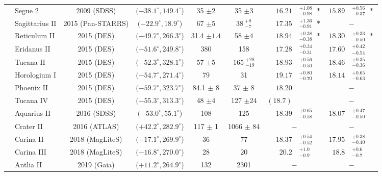 \begin{table}[p]
\begin{center}
{\begin{tabular}{cl|c|c|c|c||rl|rl}
& Segue 2 		& 2009 {\scriptsize (SDSS)} & $(-38.1^\circ, 149.4^\circ$) 		& 35 $\pm$2 	& 35 $\pm$3			& $16.21$&$^{+1.08}_{-0.98} \ \ \ast$	& $15.89$&$^{+0.56}_{-0.37} \ \ \ast$ \\
& Sagittarius II 		& 2015 {\scriptsize (Pan-STARRS)} & $(-22.9^\circ, 18.9^\circ$) & 67 $\pm$5 	& $38 \ ^{+8}_{-7}$		& $17.35$&$^{+1.36}_{-0.91} \ \ \ast$ 	& \multicolumn{2}{c}{$-$} \\ 
& Reticulum II 		& 2015 {\scriptsize (DES)} & $(-49.7^\circ, 266.3^\circ$) 		& 31.4 $\pm1.4$ 	& 58 $\pm4$		& $18.94$&$^{+0.38}_{-0.38} \ \ \ast$	& $18.30$&$^{+0.33}_{-0.50} \ \ \ast$  \\ 
& Eridanus II 		& 2015 {\scriptsize (DES)} & $(-51.6^\circ, 249.8^\circ$) 		&  380 			&  158			& $17.28$&$^{+0.34}_{-0.31}$ 		& $17.60$&$^{+0.42}_{-0.54}$ \\ 
& Tucana II 		& 2015 {\scriptsize (DES)} & $(-52.3^\circ, 328.1^\circ$) 		& 57 $\pm5$ 		& $165 \ ^{+28}_{-19}$	& $18.93$&$^{+0.56}_{-0.50}$ 	& $18.46$&$^{+0.35}_{-0.36}$  \\
& Horologium I 		& 2015 {\scriptsize (DES)} & $(-54.7^\circ, 271.4^\circ$) 		&  79				&  31				& $19.17$&$^{+0.80}_{-0.70}$ 		& $18.14$&$^{+0.65}_{-0.63}$ \\
& Phoenix II 		& 2015 {\scriptsize (DES)} & $(-59.7^\circ, 323.7^\circ$) 		& 84.1 $\pm$ 8 	& 37 $\pm$ 8		& $18.20$ &			 		& \multicolumn{2}{c}{$-$} \\ 
& Tucana IV 		& 2015 {\scriptsize (DES)} & $(-55.3^\circ, 313.3^\circ$) 		& 48 $\pm4$ 		& 127 $\pm24$		& $(18.7)$  &					& \multicolumn{2}{c}{$-$} \\
& Aquarius II 		& 2016 {\scriptsize (SDSS)} & $(-53.0^\circ, 55.1^\circ$) 		&  108		 	&  125			& $18.39$&$^{+0.65}_{-0.58}$ 		& $18.07$&$^{+0.47}_{-0.50}$ \\
& Crater II 		& 2016 {\scriptsize (ATLAS)} 	& $(+42.2^\circ, 282.9^\circ$) 	&  117 $\pm$ 1	 	&  1066 $\pm$ 84	& \multicolumn{2}{c|}{$-$}	 		& \multicolumn{2}{c}{$-$} \\
& Carina II		& 2018 {\scriptsize (MagLiteS)} & $(-17.1^\circ, 269.9^\circ$) 	&  36 			&  77				& $18.37$&$^{+0.54}_{-0.52}$ 		& $17.95$&$^{+0.38}_{-0.40}$ \\
& Carina III		& 2018 {\scriptsize (MagLiteS)} & $(-16.8^\circ, 270.0^\circ$) 	&  28				& 20				& $20.2$&$^{+1.0}_{-0.9}$		& $18.8$&$^{+0.6}_{-0.7}$ \\
& Antlia II 			& 2019 {\scriptsize (Gaia)} 	& $(+11.2^\circ, 264.9^\circ$) 	&  132 			& 2301			& \multicolumn{2}{c|}{$-$} 			& \multicolumn{2}{c}{$-$} \\

\end{tabular}}
\end{center}
\end{table}
